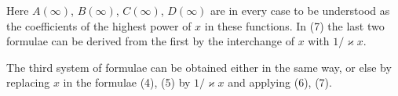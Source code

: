Here $A(\infty)$, $B(\infty)$, $C(\infty)$, $D(\infty)$ are in every case to be
understood as the coefficients of the highest power of $x$ in these functions. In
(7) the last two formulae can be derived from the first by the interchange of $x$
with $1/\varkappa x$.

The third system of formulae can be obtained either in the same way, or else
by replacing $x$ in the formulae (4), (5) by $1/\varkappa x$ and applying
(6), (7).
